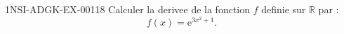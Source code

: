 \begin{exercice}{1NSI-ADGK-EX-001}{1}{8}
Calculer la derivee de la fonction $f$ definie sur $\mathbb{R}$ par :
\[ f(x) = \mathrm{e}^{3x^2 + 1}. \]

\end{exercice}
